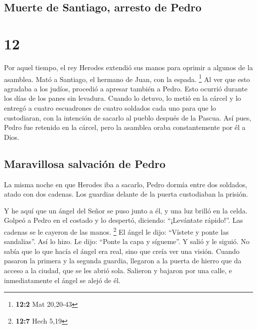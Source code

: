 \hypertarget{muerte-de-santiago-arresto-de-pedro}{%
\subsection{Muerte de Santiago, arresto de
Pedro}\label{muerte-de-santiago-arresto-de-pedro}}

\hypertarget{section-11}{%
\section{12}\label{section-11}}

 Por aquel tiempo, el rey Herodes extendió sus manos para
oprimir a algunos de la asamblea.  Mató a Santiago, el
hermano de Juan, con la espada. \footnote{\textbf{12:2} Mat 20,20-43}
 Al ver que esto agradaba a los judíos, procedió a apresar
también a Pedro. Esto ocurrió durante los días de los panes sin
levadura.  Cuando lo detuvo, lo metió en la cárcel y lo
entregó a cuatro escuadrones de cuatro soldados cada uno para que lo
custodiaran, con la intención de sacarlo al pueblo después de la Pascua.
 Así pues, Pedro fue retenido en la cárcel, pero la
asamblea oraba constantemente por él a Dios.

\hypertarget{maravillosa-salvaciuxf3n-de-pedro}{%
\subsection{Maravillosa salvación de
Pedro}\label{maravillosa-salvaciuxf3n-de-pedro}}

 La misma noche en que Herodes iba a sacarlo, Pedro dormía
entre dos soldados, atado con dos cadenas. Los guardias delante de la
puerta custodiaban la prisión.

 Y he aquí que un ángel del Señor se puso junto a él, y
una luz brilló en la celda. Golpeó a Pedro en el costado y lo despertó,
diciendo: ``¡Levántate rápido!''. Las cadenas se le cayeron de las
manos. \footnote{\textbf{12:7} Hech 5,19}  El ángel le
dijo: ``Vístete y ponte las sandalias''. Así lo hizo. Le dijo: ``Ponte
la capa y sígueme''.  Y salió y le siguió. No sabía que lo
que hacía el ángel era real, sino que creía ver una visión.
 Cuando pasaron la primera y la segunda guardia, llegaron
a la puerta de hierro que da acceso a la ciudad, que se les abrió sola.
Salieron y bajaron por una calle, e inmediatamente el ángel se alejó de
él.

